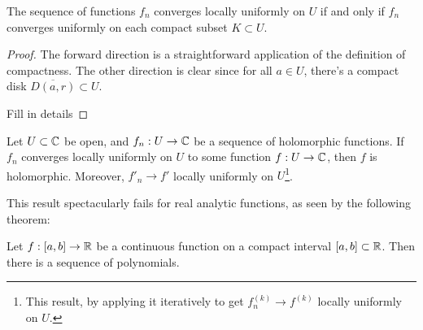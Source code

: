 \documentclass[a4paper]{scrartcl}
\begin{document}
\begin{proposition}
    The sequence of functions $f_n$ converges locally uniformly on $U$ if and only if $f_n$ converges uniformly on each compact subset $K \subset U$.
\end{proposition}
\begin{proof}
    The forward direction is a straightforward application of the definition of compactness. The other direction is clear since for all $a \in U$, there's a compact disk $\overline{D(a, r)} \subset U$.

    {\color{red} Fill in details}
\end{proof}

\begin{theorem}
    Let $U \subset \mathbb{C}$ be open, and $f_n: U \rightarrow \mathbb{C}$ be a sequence of holomorphic functions. If $f_n$ converges locally uniformly on $U$ to some function $f: U \rightarrow \mathbb{C}$, then $f$ is holomorphic. Moreover, $f'_n \rightarrow f'$ locally uniformly on $U$\footnote{This result, by applying it iteratively to get $f_n^{(k)} \rightarrow f^{(k)}$ locally uniformly on $U$.}.
\end{theorem}

This result spectacularly fails for real analytic functions, as seen by the following theorem:

\begin{theorem}
    Let $f: [a, b] \rightarrow \mathbb{R}$ be a continuous function on a compact interval $[a, b] \subset \mathbb{R}$. Then there is a sequence of polynomials.
\end{theorem}
\end{document}
